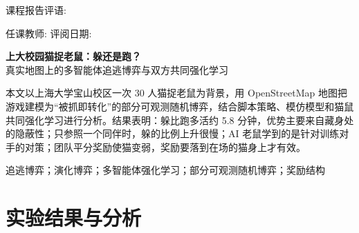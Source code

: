 \documentclass[a4paper,zihao=5,fontset=fandol,UTF8]{ctexart}
\begin{document}
\vspace{6pt}
{\fontsize{12pt}{16pt}\selectfont\heiti 课程报告评语:}

\vfill
{\fontsize{12pt}{16pt}\selectfont\heiti 任课教师: \underline{\makebox[3cm]{}}\hfill 评阅日期: \underline{\makebox[2.6cm]{}}}
\vspace{1.5cm}
\newpage

\begin{center}
{\fontsize{22pt}{30pt}\selectfont\bfseries\heiti 上大校园猫捉老鼠：躲还是跑？}\\[6pt]
{\fontsize{12pt}{16pt}\selectfont\heiti 真实地图上的多智能体追逃博弈与双方共同强化学习}
\end{center}
\vspace{4pt}

%
本文以上海大学宝山校区一次 30 人猫捉老鼠为背景，用 OpenStreetMap 地图把游戏建模为“被抓即转化”的部分可观测随机博弈，结合脚本策略、模仿模型和猫鼠共同强化学习进行分析。结果表明：躲比跑多活约 5.8 分钟，优势主要来自藏身处的隐蔽性；只参照一个同伴时，躲的比例上升很慢；AI 老鼠学到的是针对训练对手的对策；团队平分奖励使猫变弱，奖励要落到在场的猫身上才有效。

\vspace{4pt}
追逃博弈；演化博弈；多智能体强化学习；部分可观测随机博弈；奖励结构

\vspace{8pt}




\section{实验结果与分析}






\end{document}
